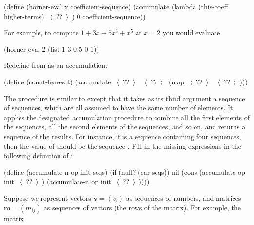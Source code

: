 \begin{exerciseGroup}
\begin{codeBlock}
(define
  (horner-eval x coefficient-sequence)
  (accumulate
    (lambda (this-coeff higher-terms) ~\(\langle \)~??~\(\rangle \)~)
    0
    coefficient-sequence))
\end{codeBlock}

For example, to compute \( 1 + 3x + 5x^3 + x^5 \) at \( x = 2 \) you
would evaluate

\begin{codeBlock}
(horner-eval 2 (list 1 3 0 5 0 1))
\end{codeBlock}

\label{Exercise 2.35}
 Redefine  from
 as an accumulation:

\begin{codeBlock}
(define (count-leaves t)
  (accumulate ~\(\langle \)~??~\(\rangle \)~ ~\(\langle \)~??~\(\rangle \)~ (map ~\(\langle \)~??~\(\rangle \)~ ~\(\langle \)~??~\(\rangle \)~)))
\end{codeBlock}

\label{Exercise 2.36}
 The procedure 
is similar to  except that it takes as its third argument a
sequence of sequences, which are all assumed to have the same number of
elements.  It applies the designated accumulation procedure to combine all the
first elements of the sequences, all the second elements of the sequences, and
so on, and returns a sequence of the results.  For instance, if  is a
sequence containing four sequences,  then the value of  should be the sequence
.  Fill in the missing expressions in the following definition
of :

\begin{codeBlock}
(define (accumulate-n op init seqs)
  (if (null? (car seqs))
      nil
      (cons (accumulate op init ~\(\langle \)~??~\(\rangle \)~)
            (accumulate-n op init ~\(\langle \)~??~\(\rangle \)~))))
\end{codeBlock}

\label{Exercise 2.37}
Suppose we represent vectors \( \mathbf{v} = (v_i) \) as sequences of numbers, and
matrices \( \mathbf{m} = (m_{ij}) \) as sequences of vectors (the rows of the
matrix).  For example, the matrix


\end{exerciseGroup}
